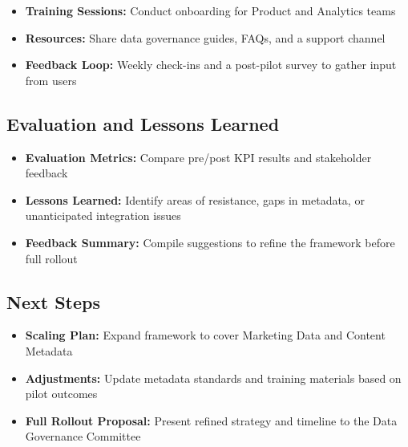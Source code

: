 \documentclass[11pt,a4paper,computermodern]{article}
\begin{document}
\begin{itemize}[itemsep=5pt, parsep=0pt]
	\item \textbf{Training Sessions:} Conduct onboarding for Product and Analytics teams
	\item \textbf{Resources:} Share data governance guides, FAQs, and a support channel
	\item \textbf{Feedback Loop:} Weekly check-ins and a post-pilot survey to gather input from users
\end{itemize}


\subsection*{Evaluation and Lessons Learned}

\begin{itemize}[itemsep=5pt, parsep=0pt]
	\item \textbf{Evaluation Metrics:} Compare pre/post KPI results and stakeholder feedback
	\item \textbf{Lessons Learned:} Identify areas of resistance, gaps in metadata, or unanticipated integration issues
	\item \textbf{Feedback Summary:} Compile suggestions to refine the framework before full rollout
\end{itemize}


\subsection*{Next Steps}

\begin{itemize}[itemsep=5pt, parsep=0pt]
	\item \textbf{Scaling Plan:} Expand framework to cover Marketing Data and Content Metadata
	\item \textbf{Adjustments:} Update metadata standards and training materials based on pilot outcomes
	\item \textbf{Full Rollout Proposal:} Present refined strategy and timeline to the Data Governance Committee
\end{itemize}
\end{document}
